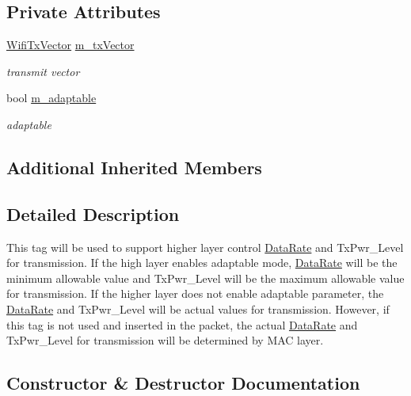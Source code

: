 \subsection*{Private Attributes}
\begin{DoxyCompactItemize}
\item 
\hyperlink{classns3_1_1WifiTxVector}{Wifi\+Tx\+Vector} \hyperlink{classns3_1_1HigherLayerTxVectorTag_a568e75c39a2d8ccd08d87079cce273c9}{m\+\_\+tx\+Vector}
\begin{DoxyCompactList}\small\item\em transmit vector \end{DoxyCompactList}\item 
bool \hyperlink{classns3_1_1HigherLayerTxVectorTag_a4e86e370dc295a18951f1533bed551e6}{m\+\_\+adaptable}
\begin{DoxyCompactList}\small\item\em adaptable \end{DoxyCompactList}\end{DoxyCompactItemize}
\subsection*{Additional Inherited Members}


\subsection{Detailed Description}
This tag will be used to support higher layer control \hyperlink{classns3_1_1DataRate}{Data\+Rate} and Tx\+Pwr\+\_\+\+Level for transmission. If the high layer enables adaptable mode, \hyperlink{classns3_1_1DataRate}{Data\+Rate} will be the minimum allowable value and Tx\+Pwr\+\_\+\+Level will be the maximum allowable value for transmission. If the higher layer does not enable adaptable parameter, the \hyperlink{classns3_1_1DataRate}{Data\+Rate} and Tx\+Pwr\+\_\+\+Level will be actual values for transmission. However, if this tag is not used and inserted in the packet, the actual \hyperlink{classns3_1_1DataRate}{Data\+Rate} and Tx\+Pwr\+\_\+\+Level for transmission will be determined by M\+AC layer. 

\subsection{Constructor \& Destructor Documentation}

